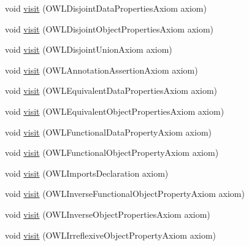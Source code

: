 \begin{DoxyCompactItemize}
void \hyperlink{classorg_1_1coode_1_1owlapi_1_1latex_1_1_latex_object_visitor_ad35dc3fd38d62961ea54ae799cdc8b4f}{visit} (O\-W\-L\-Disjoint\-Data\-Properties\-Axiom axiom)
\item 
void \hyperlink{classorg_1_1coode_1_1owlapi_1_1latex_1_1_latex_object_visitor_a9118600a1083336d3719b48145b55460}{visit} (O\-W\-L\-Disjoint\-Object\-Properties\-Axiom axiom)
\item 
void \hyperlink{classorg_1_1coode_1_1owlapi_1_1latex_1_1_latex_object_visitor_aca9ce48135a09bf50889e3b240cebbd1}{visit} (O\-W\-L\-Disjoint\-Union\-Axiom axiom)
\item 
void \hyperlink{classorg_1_1coode_1_1owlapi_1_1latex_1_1_latex_object_visitor_a36fddbeffcaadb5bfa16ec72e322f289}{visit} (O\-W\-L\-Annotation\-Assertion\-Axiom axiom)
\item 
void \hyperlink{classorg_1_1coode_1_1owlapi_1_1latex_1_1_latex_object_visitor_af96ff2ebda61138ce6d3ffd6cfde58d4}{visit} (O\-W\-L\-Equivalent\-Data\-Properties\-Axiom axiom)
\item 
void \hyperlink{classorg_1_1coode_1_1owlapi_1_1latex_1_1_latex_object_visitor_ac476ef67a0f64bda41884c36b62cb8e3}{visit} (O\-W\-L\-Equivalent\-Object\-Properties\-Axiom axiom)
\item 
void \hyperlink{classorg_1_1coode_1_1owlapi_1_1latex_1_1_latex_object_visitor_a9f862eb367fffc815d6cb3fe55911a75}{visit} (O\-W\-L\-Functional\-Data\-Property\-Axiom axiom)
\item 
void \hyperlink{classorg_1_1coode_1_1owlapi_1_1latex_1_1_latex_object_visitor_aeb78ae9cd0feed1e0a1d6cd64046cb0e}{visit} (O\-W\-L\-Functional\-Object\-Property\-Axiom axiom)
\item 
void \hyperlink{classorg_1_1coode_1_1owlapi_1_1latex_1_1_latex_object_visitor_a1ff9b5260c8c691823893ed20908910f}{visit} (O\-W\-L\-Imports\-Declaration axiom)
\item 
void \hyperlink{classorg_1_1coode_1_1owlapi_1_1latex_1_1_latex_object_visitor_aff77730894ede7bdb863d045dc5daaf7}{visit} (O\-W\-L\-Inverse\-Functional\-Object\-Property\-Axiom axiom)
\item 
void \hyperlink{classorg_1_1coode_1_1owlapi_1_1latex_1_1_latex_object_visitor_abc7e18f61d4e295f1c6d09df14933b47}{visit} (O\-W\-L\-Inverse\-Object\-Properties\-Axiom axiom)
\item 
void \hyperlink{classorg_1_1coode_1_1owlapi_1_1latex_1_1_latex_object_visitor_a2d01e754fc1f734be9555ffa5553c86d}{visit} (O\-W\-L\-Irreflexive\-Object\-Property\-Axiom axiom)
\item 

\end{DoxyCompactItemize}
